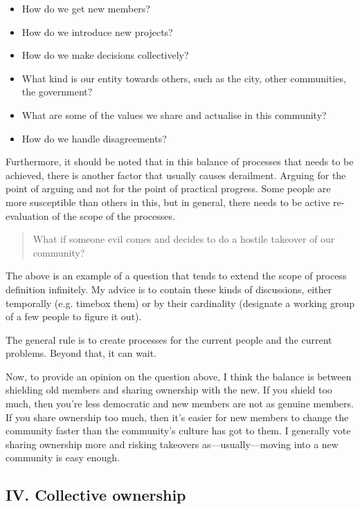 \begin{itemize}
    \item{How do we get new members?}
    \item{How do we introduce new projects?}
    \item{How do we make decisions collectively?}
    \item{What kind is our entity towards others, such as the city, other communities, the government?}
    \item{What are some of the values we share and actualise in this community?}
    \item{How do we handle disagreements?}
\end{itemize}

Furthermore, it should be noted that in this balance of processes that needs to be achieved, there is another factor that usually causes derailment. Arguing for the point of arguing and not for the point of practical progress. Some people are more susceptible than others in this, but in general, there needs to be active re-evaluation of the scope of the processes.

\begin{quote}
    What if someone evil comes and decides to do a hostile takeover of our community?
\end{quote}

The above is an example of a question that tends to extend the scope of process definition infinitely. My advice is to contain these kinds of discussions, either temporally (e.g. timebox them) or by their cardinality (designate a working group of a few people to figure it out).

The general rule is to create processes for the current people and the current problems. Beyond that, it can wait.

Now, to provide an opinion on the question above, I think the balance is between shielding old members and sharing ownership with the new. If you shield too much, then you’re less democratic and new members are not as genuine members. If you share ownership too much, then it’s easier for new members to change the community faster than the community’s culture has got to them. I generally vote sharing ownership more and risking takeovers as—usually—moving into a new community is easy enough.

\subsection{IV. Collective ownership}

